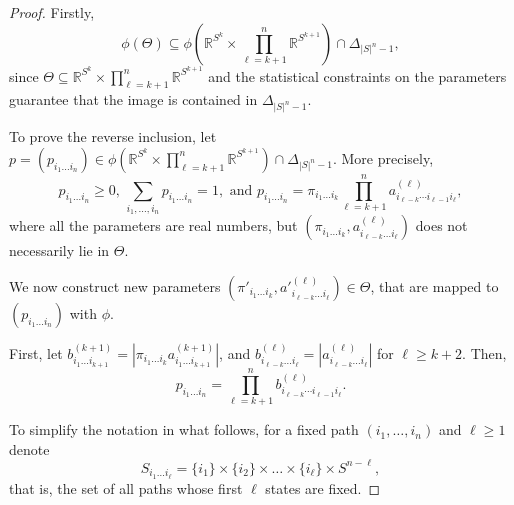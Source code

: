 \documentclass[11pt, a4paper]{article}
\numberwithin{equation}{section}
\theoremstyle{plain}
\theoremstyle{definition}
\begin{document}
\begin{proof}
Firstly, 
\[
\phi(\Theta) \subseteq \phi \left(\mathbb{R}^{S^k} \times \prod_{\ell=k+1}^n \mathbb{R}^{S^{k+1}}\right)  \cap \Delta_{|S|^n-1},
\]
since $\Theta\subseteq \mathbb{R}^{S^k} \times \prod_{\ell=k+1}^n \mathbb{R}^{S^{k+1}}$ and the statistical constraints on the parameters guarantee that the image is contained in $\Delta_{|S|^n-1}$. 

To prove the reverse inclusion, let $p=(p_{i_1\ldots i_n})\in \phi (\mathbb{R}^{S^k} \times \prod_{\ell=k+1}^n \mathbb{R}^{S^{k+1}})  \cap \Delta_{|S|^n-1} $. More precisely, 
\[
p_{i_1 \ldots i_n} \geq 0, \,  \sum_{i_1,\ldots,i_n}p_{i_1 \ldots i_n} = 1, \text{ and } p_{i_1\ldots i_n}=\pi_{i_1\ldots i_k}\prod_{\ell=k+1}^n a^{(\ell)}_{i_{\ell-k}\cdots i_{\ell-1} i_{\ell}},
\]
where all the parameters are real numbers, but $(\pi_{i_1\ldots i_k},a^{(\ell)}_{i_{\ell-k}\ldots i_\ell})$ does not necessarily lie in $\Theta$.

We now construct new parameters
$(\pi'_{i_1\ldots i_k},a'^{(\ell)}_{i_{\ell-k}\ldots i_\ell})\in \Theta$, that are mapped to $(p_{i_1\ldots i_n})$ with $\phi$.

First, let
$b^{(k+1)}_{i_1\ldots i_{k+1}} = \left| \pi_{i_1\ldots i_k}a^{(k+1)}_{i_1\ldots i_{k+1}} \right|$, and $b^{(\ell)}_{i_{\ell-k}\ldots i_{\ell}}=\left|a^{(\ell)}_{i_{\ell-k}\ldots i_{\ell}} \right|$ for $\ell\geq k+2$. 
Then, \[
p_{i_1\ldots i_n}=\prod_{\ell=k+1}^n b^{(\ell)}_{i_{\ell-k}\cdots i_{\ell-1} i_{\ell}}.
\]

To simplify the notation in what follows, for a fixed path $(i_1, \ldots, i_n)$ and $\ell\geq 1$ denote
$$S_{i_1\ldots i_\ell} = \{i_1\}\times \{i_2\}\times \ldots \times \{i_\ell\} \times S^{n-\ell},$$
that is, the set of all paths whose first $\ell$ states are fixed.


\end{proof}
\end{document}
